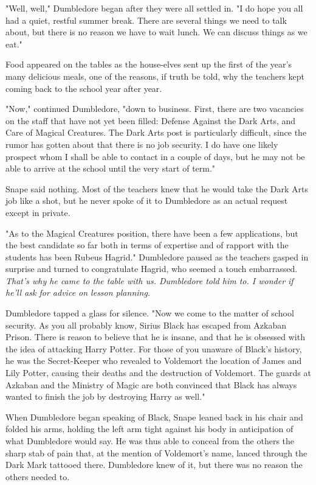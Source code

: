 "Well, well," Dumbledore began after they were all settled in. "I do hope you all had a quiet, restful summer break. There are several things we need to talk about, but there is no reason we have to wait lunch. We can discuss things as we eat."

Food appeared on the tables as the house-elves sent up the first of the year's many delicious meals, one of the reasons, if truth be told, why the teachers kept coming back to the school year after year.

"Now," continued Dumbledore, "down to business. First, there are two vacancies on the staff that have not yet been filled: Defense Against the Dark Arts, and Care of Magical Creatures. The Dark Arts post is particularly difficult, since the rumor has gotten about that there is no job security. I do have one likely prospect whom I shall be able to contact in a couple of days, but he may not be able to arrive at the school until the very start of term."

Snape said nothing. Most of the teachers knew that he would take the Dark Arts job like a shot, but he never spoke of it to Dumbledore as an actual request except in private.

"As to the Magical Creatures position, there have been a few applications, but the best candidate so far both in terms of expertise and of rapport with the students has been Rubeus Hagrid." Dumbledore paused as the teachers gasped in surprise and turned to congratulate Hagrid, who seemed a touch embarrassed. \emph{That's why he came to the table with us. Dumbledore told him to. I wonder if he'll ask for advice on lesson planning.}

Dumbledore tapped a glass for silence. "Now we come to the matter of school security. As you all probably know, Sirius Black has escaped from Azkaban Prison. There is reason to believe that he is insane, and that he is obsessed with the idea of attacking Harry Potter. For those of you unaware of Black's history, he was the Secret-Keeper who revealed to Voldemort the location of James and Lily Potter, causing their deaths and the destruction of Voldemort. The guards at Azkaban and the Ministry of Magic are both convinced that Black has always wanted to finish the job by destroying Harry as well."

When Dumbledore began speaking of Black, Snape leaned back in his chair and folded his arms, holding the left arm tight against his body in anticipation of what Dumbledore would say. He was thus able to conceal from the others the sharp stab of pain that, at the mention of Voldemort's name, lanced through the Dark Mark tattooed there. Dumbledore knew of it, but there was no reason the others needed to.

